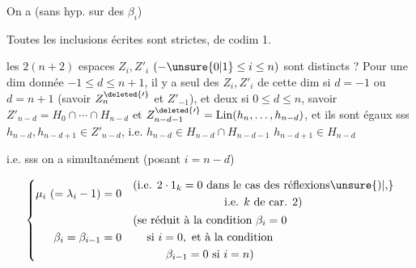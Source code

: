 On a (sans hyp. sur  des $\beta_i$)


Toutes les inclusions écrites sont strictes, de codim 1.

 les $2(n+2)$ espaces $Z_i,Z'_i$ $( -\unsure{0|1}\le i\le n)$ sont distincts ?  Pour une dim donnée $-1\le d\le n+1$, il y a    seul des $Z_i,Z'_i$ de cette dim si $d=-1$ ou $d=n+1$ (savoir $Z_n^{\deleted{\prime}}$ et $Z'_{-1}$), et  deux si $0\le d\le n$, savoir $Z'_{n-d}=H_0\cap\cdots\cap H_{n-d}$  et $Z_{n-d-1}^{\deleted{\prime}}=\mathrm{Lin}(h_n,\ldots,h_{n-d})$,  et ils  sont égaux sss $h_{n-d},h_{n-d+1}\in Z'_{n-d}$, i.e. $h_{n-d}\in H_{n-d}\cap H_{n-d-1}$ $h_{n-d+1}\in H_{n-d}$


i.e. sss on a simultanément (posant $i=n-d$)

\[
\left\{\begin{aligned}
\mu_i\ (=\lambda_i-1)&=0&&
\begin{gathered}
\text{(i.e. }2\cdot1_k=0\text{ dans le cas des réflexions\unsure{)|,}}\\
\text{i.e. } k\text{ de car. }2)
\end{gathered}\\
\beta_i=\beta_{i-1}&=0&&
\begin{gathered}
\text{(se réduit à la condition }\beta_i=0\\
\text{si }i=0,\text{ et à la condition}\\
\beta_{i-1}=0\text{ si }i=n)
\end{gathered}
\end{aligned}\right.
\]

